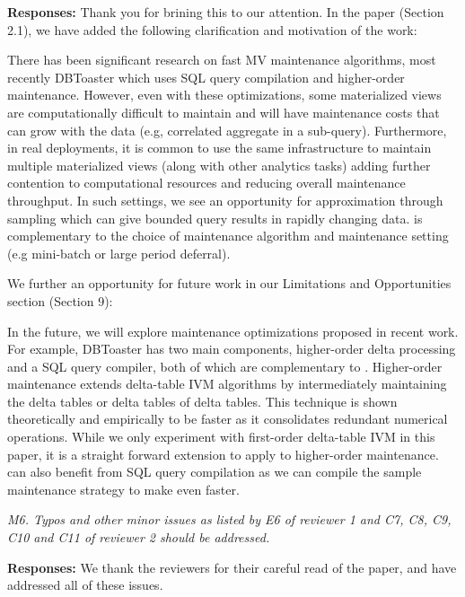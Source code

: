 {\bf Responses:} Thank you for brining this to our attention. In the paper (Section 2.1), we have added the following clarification and motivation of the work:
\begin{displayquote}
There has been significant research on fast MV maintenance algorithms, most recently DBToaster \cite{DBLP:journals/vldb/KochAKNNLS14} which uses SQL query compilation and higher-order maintenance.
However, even with these optimizations, some materialized views are computationally difficult to maintain and will have maintenance costs that can grow with the data (e.g, correlated aggregate in a sub-query).
Furthermore, in real deployments, it is common to use the same infrastructure to maintain multiple materialized views (along with other analytics tasks) adding further contention to computational resources and reducing overall maintenance throughput.
In such settings, we see an opportunity for approximation through sampling which can give bounded query results in rapidly changing data.
\svc is complementary to the choice of maintenance algorithm and maintenance setting (e.g mini-batch or large period deferral).
\end{displayquote}

We further an opportunity for future work in our Limitations and Opportunities section (Section 9):
\begin{displayquote}
In the future, we will explore maintenance optimizations proposed in recent work.
For example, DBToaster has two main components, higher-order delta processing and a SQL query compiler, both of which are complementary to \svc.
Higher-order maintenance extends delta-table IVM algorithms by intermediately maintaining the delta tables or delta tables of delta tables.
This technique is shown theoretically and empirically to be faster as it consolidates redundant numerical operations.
While we only experiment with first-order delta-table IVM in this paper, it is a straight forward extension to apply \svc to higher-order maintenance.
\svc can also benefit from SQL query compilation as we can compile the sample maintenance strategy to make \svc even faster.
\end{displayquote}

\vspace{1em}
\emph{M6. Typos and other minor issues as listed by E6 of reviewer 1 and C7, C8, C9, C10 and C11 of reviewer 2 should be addressed.}

\vspace{.25em}

{\bf Responses:} We thank the reviewers for their careful read of the paper, and have addressed all of these issues.

